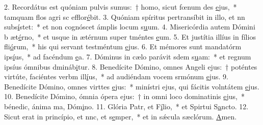 2. Recordátus est quóniam pulvis sumus:~† homo, sicut fœnum des \uline{e}jus,~* tamquam flos agri sc efflor\uline{é}bit.
3. Quóniam spíritus pertransíbit in illo, et nn subs\uline{í}stet:~* et non cognóscet ámplis locum s\uline{u}um.
4. Misericórdia autem Dómini b æt\uline{é}rno,~* et usque in ætérnum super tméntes \uline{e}um.
5. Et justítia illíus in fílios fli\uline{ó}rum,~* his qui servant testméntum \uline{e}jus.
6. Et mémores sunt mandatórm ips\uline{í}us,~* ad facéndum \uline{e}a.
7. Dóminus in cælo parávit sdem s\uline{u}am:~* et regnum ipsíus ómnibus dmináb\uline{i}tur.
8. Benedícite Dómino, omnes Angeli ejus:~† poténtes virtúte, faciéntes verbm ill\uline{í}us,~* ad audiéndam vocem srmónum \uline{e}jus.
9. Benedícite Dómino, omnes virttes \uline{e}jus:~* minístri ejus, qui fácitis volntátem \uline{e}jus.
10. Benedícite Dómino, ómnia ópera ejus:~† in omni loco dominatinis \uline{e}jus,~* bénedic, ánima ma, Dóm\uline{i}no.
11. Glória Patr, et F\uline{í}lio,~* et Spirtui S\uline{a}ncto.
12. Sicut erat in princípio, et nnc, et s\uline{e}mper,~* et in sǽcula sæclórum. \uline{A}men.
